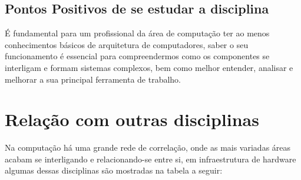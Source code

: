 \documentclass[a4paper,10]{article}
\begin{document}

\subsection{Pontos Positivos de se estudar a disciplina}

É fundamental para um profissional da área de computação ter ao menos conhecimentos básicos de arquitetura de computadores, saber o seu funcionamento é essencial para compreendermos como os componentes se interligam e formam sistemas complexos, bem como melhor entender, analisar e melhorar a sua principal ferramenta de trabalho.  

\newpage
\section{Relação com outras disciplinas}

Na computação há uma grande rede de correlação, onde as mais variadas áreas acabam se interligando e relacionando-se entre si, em infraestrutura de hardware algumas dessas disciplinas são mostradas na tabela a seguir:
\end{document}
